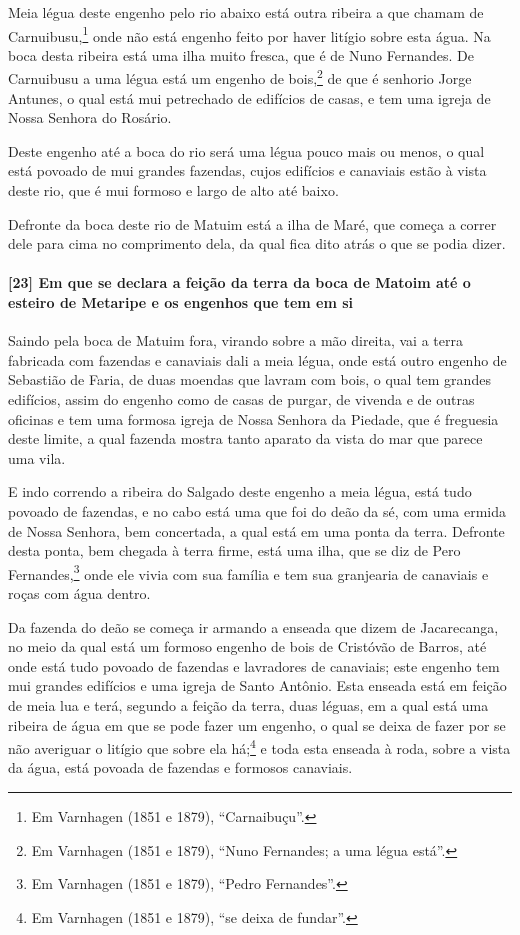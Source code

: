 \begin{linenumbers}
Meia légua deste engenho pelo rio abaixo está outra ribeira a que chamam de
Carnuibusu,\footnote{ Em Varnhagen (1851 e 1879), ``Carnaibuçu''.} onde não está engenho
feito por haver litígio sobre esta água. Na boca desta ribeira está uma ilha muito fresca,
que é de Nuno Fernandes. De Carnuibusu a uma légua está um engenho de bois,\footnote{ Em
Varnhagen (1851 e 1879), ``Nuno Fernandes; a uma légua está''.} de que é senhorio Jorge
Antunes, o qual está mui petrechado de edifícios de casas, e tem uma igreja de Nossa
Senhora do Rosário.

Deste engenho até a boca do rio será uma légua pouco mais ou menos, o qual está povoado de
mui grandes fazendas, cujos edifícios e canaviais estão à vista deste rio, que é mui
formoso e largo de alto até baixo.

Defronte da boca deste rio de Matuim está a ilha de Maré, que começa a correr dele para
cima no comprimento dela, da qual fica dito atrás o que se podia dizer.

\paragraph{[23] Em que se declara a feição da terra da boca de Matoim até o esteiro de
Metaripe e os engenhos que tem em si}\quad
Saindo pela boca de Matuim fora, virando sobre a mão direita, vai a terra fabricada com
fazendas e canaviais dali a meia légua, onde está outro engenho de Sebastião de Faria, de
duas moendas que lavram com bois, o qual tem grandes edifícios, assim do engenho como de
casas de purgar, de vivenda e de outras oficinas e tem uma formosa igreja de Nossa Senhora
da Piedade, que é freguesia deste limite, a qual fazenda mostra tanto aparato da vista do
mar que parece uma vila.

E indo correndo a ribeira do Salgado deste engenho a meia légua, está tudo povoado de
fazendas, e no cabo está uma que foi do deão da sé, com uma ermida de Nossa Senhora, bem
concertada, a qual está em uma ponta da terra. Defronte desta ponta, bem chegada à terra
firme, está uma ilha, que se diz de Pero Fernandes,\footnote{ Em Varnhagen (1851 e 1879),
``Pedro Fernandes''.} onde ele vivia com sua família e tem sua granjearia de canaviais e
roças com água dentro.

Da fazenda do deão se começa ir armando a enseada que dizem de Jacarecanga, no meio da
qual está um formoso engenho de bois de Cristóvão de Barros, até onde está tudo povoado de
fazendas e lavradores de canaviais; este engenho tem mui grandes edifícios e uma igreja de
Santo Antônio. Esta enseada está em feição de meia lua e terá, segundo a feição da terra,
duas léguas, em a qual está uma ribeira de água em que se pode fazer um engenho, o qual se
deixa de fazer por se não averiguar o litígio que sobre ela há;\footnote{ Em Varnhagen
(1851 e 1879), ``se deixa de fundar''.} e toda esta enseada à roda, sobre a vista da água,
está povoada de fazendas e formosos canaviais.


\end{linenumbers}
